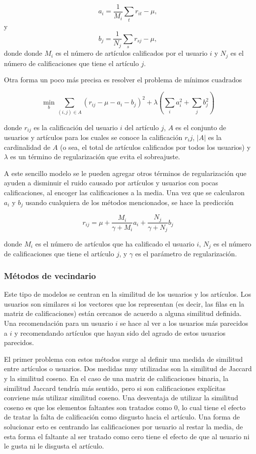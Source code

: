 \[
a_i = \frac{1}{M_i} \sum_t r_{it} - \mu,
\]
y 
\[
b_j = \frac{1}{N_j} \sum_s r_{sj} - \mu,
\]
donde donde $M_i$ es el número de artículos calificados por el usuario $i$ y $N_j$ es el número de calificaciones que tiene el artículo $j$.

Otra forma un poco más precisa es resolver el problema de mínimos cuadrados

\[
\min_{b} \sum_{(i, j) \in A} \left( r_{ij} - \mu - a_i - b_j \right) ^2 + \lambda \left( \sum_{i} a_i^2 + \sum_{j} b_j^2 \right)
\]

donde $r_{ij}$ es la calificación del usuario $i$ del artículo $j$, $A$ es el conjunto de usuarios y artículos para los cuales se conoce la calificación $r_ij$, $ \vert A \vert$ es la cardinalidad de $A$ (o sea, el total de artículos calificados por todos los usuarios) y $\lambda$ es un término de regularización que evita el sobreajuste.

A este sencillo modelo se le pueden agregar otros términos de regularización que ayuden a disminuir el ruido causado por artículos y usuarios con pocas calificaciones, al encoger las calificaciones a la media. Una vez que se calcularon $a_i$ y $b_j$ usando cualquiera de los métodos mencionados, se hace la predicción

\begin{equation}
  \label{ec:modelo_base}
  r_{ij} = \mu + \frac{M_i}{\gamma + M_i} a_i + \frac{N_j}{\gamma + N_j}b_j
\end{equation}

donde $M_i$ es el número de artículos que ha calificado el usuario $i$, $N_j$ es el número de calificaciones que tiene el artículo $j$, y $\gamma$ es el parámetro de regularización.

\subsubsection{Métodos de vecindario}

Este tipo de modelos se centran en la similitud de los usuarios y los artículos. Los usuarios son similares si los vectores que los representan (es decir, las filas en la matriz de calificaciones) están cercanos de acuerdo a alguna similitud definida. Una recomendación para un usuario $i$ se hace al ver a los usuarios más parecidos a $i$ y recomendando artículos que hayan sido del agrado de estos usuarios parecidos.

El primer problema con estos métodos surge al definir una medida de similitud entre artículos o usuarios. Dos medidas muy utilizadas son la similitud de Jaccard y la similitud coseno. En el caso de una matriz de calificaciones binaria, la similitud Jaccard tendría más sentido, pero si son calificaciones explícitas conviene más utilizar similitud coseno. Una desventaja de utilizar la similitud coseno es que los elementos faltantes son tratados como $0$, lo cual tiene el efecto de tratar la falta de calificación como disgusto hacia el artículo. Una forma de solucionar esto es centrando las calificaciones por usuario al restar la media, de esta forma el faltante al ser tratado como cero tiene el efecto de que al usuario ni le gusta ni le disgusta el artículo.

